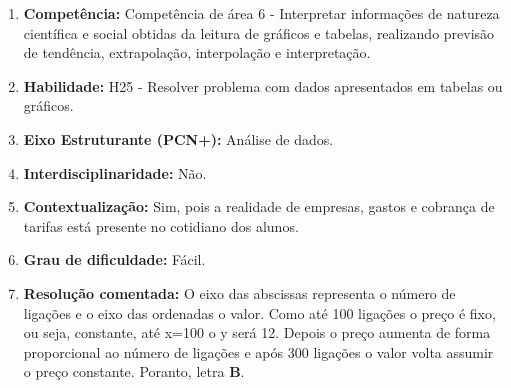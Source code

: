 \documentclass[a4paper, 12pt]{article}
\begin{document}
\begin{enumerate}
  \begin{enumerate}
  \item \textbf{Competência: }
    Competência de área 6 - Interpretar informações de natureza científica e social obtidas da leitura de gráficos e tabelas, realizando previsão de tendência, extrapolação, interpolação e interpretação.
  \item \textbf{Habilidade: }
    H25 - Resolver problema com dados apresentados em tabelas ou gráficos.
  \item \textbf{Eixo Estruturante (PCN+): }
    Análise de dados.
  \item \textbf{Interdisciplinaridade: }
    Não.
  \item \textbf{Contextualização: }
    Sim, pois a realidade de empresas, gastos e cobrança de tarifas está presente no cotidiano dos alunos.
  \item \textbf{Grau de dificuldade: }
    Fácil.
  \item \textbf{Resolução comentada: }
    O eixo das abscissas representa o número de ligações e o eixo das ordenadas o valor. Como até 100 ligações o preço é fixo, ou seja, constante, até x=100 o y será 12. Depois o preço aumenta de forma proporcional ao número de ligações e após 300 ligações o valor volta assumir o preço constante. Poranto, letra \textbf{B}.
  \end{enumerate}  
\end{enumerate}
\end{document}
